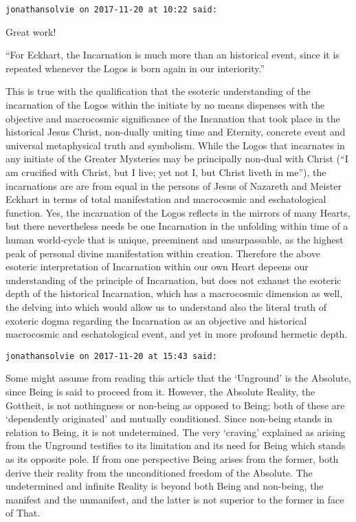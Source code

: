 \begin{footnotesize}\begin{sffamily}



\texttt{jonathansolvie on 2017-11-20 at 10:22 said: }

Great work!

“For Eckhart, the Incarnation is much more than an historical event, since it is repeated whenever the Logos is born again in our interiority.”

This is true with the qualification that the esoteric understanding of the incarnation of the Logos within the initiate by no means dispenses with the objective and macrocosmic significance of the Incanation that took place in the historical Jesus Christ, non-dually uniting time and Eternity, concrete event and universal metaphysical truth and symbolism. While the Logos that incarnates in any initiate of the Greater Mysteries may be principally non-dual with Christ (“I am crucified with Christ, but I live; yet not I, but Christ liveth in me”), the incarnations are are from equal in the persons of Jesus of Nazareth and Meister Eckhart in terms of total manifestation and macrocosmic and eschatological function. Yes, the incarnation of the Logos reflects in the mirrors of many Hearts, but there nevertheless needs be one Incarnation in the unfolding within time of a human world-cycle that is unique, preeminent and unsurpassable, as the highest peak of personal divine manifestation within creation. Therefore the above esoteric interpretation of Incarnation within our own Heart depeens our understanding of the principle of Incarnation, but does not exhaust the esoteric depth of the historical Incarnation, which has a macrocosmic dimension as well, the delving into which would allow us to understand also the literal truth of exoteric dogma regarding the Incarnation as an objective and historical macrocosmic and eschatological event, and yet in more profound hermetic depth.


\hfill

\texttt{jonathansolvie on 2017-11-20 at 15:43 said: }

Some might assume from reading this article that the `Unground' is the Absolute, since Being is said to proceed from it. However, the Absolute Reality, the Gottheit, is not nothingness or non-being as opposed to Being; both of these are `dependently originated' and mutually conditioned. Since non-being stands in relation to Being, it is not undetermined. The very `craving' explained as arising from the Unground testifies to its limitation and its need for Being which stands as its opposite pole. If from one perspective Being arises from the former, both derive their reality from the unconditioned freedom of the Absolute. The undetermined and infinite Reality is beyond both Being and non-being, the manifest and the unmanifest, and the latter is not superior to the former in face of That. 


\end{sffamily}
\end{footnotesize}
